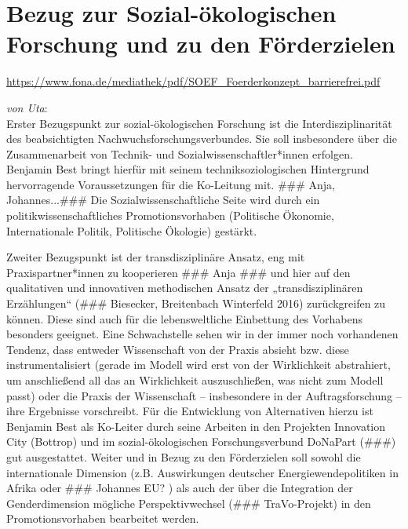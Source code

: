 \documentclass[a4paper,11pt,twoside]{scrartcl}
\begin{document}
\section{Bezug zur Sozial-ökologischen Forschung und zu den Förderzielen}

\url{https://www.fona.de/mediathek/pdf/SOEF_Foerderkonzept_barrierefrei.pdf}


\textit{von Uta}:\\
Erster Bezugspunkt zur sozial-ökologischen Forschung ist die Interdisziplinarität des beabsichtigten Nachwuchsforschungsverbundes. Sie soll insbesondere über die Zusammenarbeit von Technik- und Sozialwissenschaftler*innen erfolgen. Benjamin Best bringt hierfür mit seinem techniksoziologischen Hintergrund hervorragende Voraussetzungen für die Ko-Leitung mit. ### Anja, Johannes...### Die Sozialwissenschaftliche Seite wird durch ein politikwissenschaftliches Promotionsvorhaben (Politische Ökonomie, Internationale Politik, Politische Ökologie) gestärkt.

Zweiter Bezugspunkt ist der transdisziplinäre Ansatz, eng mit Praxispartner*innen zu kooperieren ### Anja ### und hier auf den qualitativen und innovativen methodischen Ansatz der „transdisziplinären Erzählungen“ (### Biesecker, Breitenbach Winterfeld 2016) zurückgreifen zu können. Diese sind auch für die lebensweltliche Einbettung des Vorhabens besonders geeignet. Eine Schwachstelle sehen wir in der immer noch vorhandenen Tendenz, dass entweder Wissenschaft von der Praxis absieht bzw. diese instrumentalisiert (gerade im Modell wird erst von der Wirklichkeit abstrahiert, um anschließend all das an Wirklichkeit auszuschließen, was nicht zum Modell passt) oder die Praxis der Wissenschaft – insbesondere in der Auftragsforschung – ihre Ergebnisse vorschreibt. Für die Entwicklung von Alternativen hierzu ist Benjamin Best als Ko-Leiter durch seine Arbeiten in den Projekten Innovation City (Bottrop) und im sozial-ökologischen Forschungsverbund DoNaPart (###) gut ausgestattet.
Weiter und in Bezug zu den Förderzielen soll sowohl die internationale Dimension (z.B. Auswirkungen deutscher Energiewendepolitiken in Afrika oder ### Johannes EU? ) als auch der über die Integration der Genderdimension mögliche Perspektivwechsel (### TraVo-Projekt) in den Promotionsvorhaben bearbeitet werden.
\end{document}

